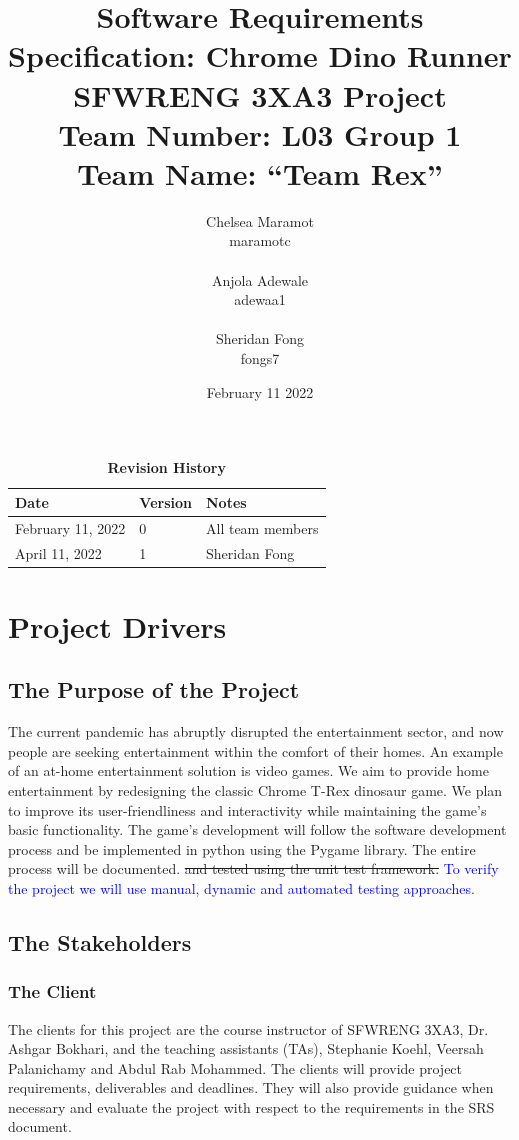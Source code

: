 \documentclass[12pt]{article}
\title{Software Requirements Specification: Chrome Dino Runner \\ \bigskip \large SFWRENG 3XA3 Project \\ \bigskip \large Team Number: L03 Group 1 \\ \large Team Name: ``Team Rex'' }
\author{Chelsea Maramot \\ maramotc \\ \\ Anjola Adewale \\ adewaa1 \\ \\ Sheridan Fong \\ fongs7 }
\date{February 11 2022}
\begin{document}
\maketitle
\newpage
\tableofcontents


\newpage
\begin{table}[h]
\caption{\bf Revision History}
\begin{tabularx}{\textwidth}{p{3cm}p{2cm}X}
    \toprule {\bf Date} & {\bf Version} & {\bf Notes}\\
    \midrule
    February 11, 2022 & 0 & All team members\\
    \midrule
    April 11, 2022 & 1 & Sheridan Fong\\
    \bottomrule
    
\end{tabularx}
\end{table}
\newpage
\section{Project Drivers}
\subsection{The Purpose of the Project}
The current pandemic has abruptly disrupted the entertainment sector, and now people are seeking entertainment within the comfort of their homes. An example of an at-home entertainment solution is video games. We aim to provide home entertainment by redesigning the classic Chrome T-Rex dinosaur game. We plan to improve its user-friendliness and interactivity while maintaining the game’s basic functionality. The game's development will follow the software development process and be implemented in python using the Pygame library. The entire process will be documented\textcolor{blue}{.} \sout{and tested using the unit test framework.}  \textcolor{blue}{To verify the project we will use manual, dynamic and automated testing approaches.}
\subsection{The Stakeholders}
\subsubsection{The Client}
The clients for this project are the course instructor of SFWRENG 3XA3, Dr. Ashgar Bokhari, and the teaching assistants (TAs), Stephanie Koehl, Veersah Palanichamy and Abdul Rab Mohammed. The clients will provide project requirements, deliverables and deadlines. They will also provide guidance when necessary and evaluate the project with respect to the requirements in the SRS document. 
\end{document}
